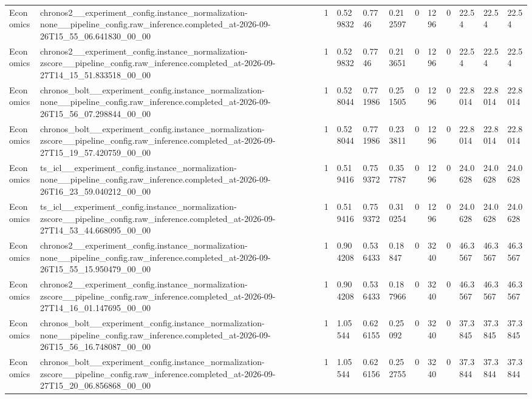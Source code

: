 \begin{tabular}{llllllllllll}
Economics & chronos2\_\_experiment\_config.instance\_normalization-none\_\_pipeline\_config.raw\_inference.completed\_at-2026-09-26T15\_55\_06.641830\_00\_00 & 1 & 0.529832 & 0.7746 & 0.212597 & 0 & 1296 & 0 & 22.54 & 22.54 & 22.54 \\
Economics & chronos2\_\_experiment\_config.instance\_normalization-zscore\_\_pipeline\_config.raw\_inference.completed\_at-2026-09-27T14\_15\_51.833518\_00\_00 & 1 & 0.529832 & 0.7746 & 0.213651 & 0 & 1296 & 0 & 22.54 & 22.54 & 22.54 \\
Economics & chronos\_bolt\_\_experiment\_config.instance\_normalization-none\_\_pipeline\_config.raw\_inference.completed\_at-2026-09-26T15\_56\_07.298844\_00\_00 & 1 & 0.528044 & 0.771986 & 0.251505 & 0 & 1296 & 0 & 22.8014 & 22.8014 & 22.8014 \\
Economics & chronos\_bolt\_\_experiment\_config.instance\_normalization-zscore\_\_pipeline\_config.raw\_inference.completed\_at-2026-09-27T15\_19\_57.420759\_00\_00 & 1 & 0.528044 & 0.771986 & 0.233811 & 0 & 1296 & 0 & 22.8014 & 22.8014 & 22.8014 \\
Economics & ts\_icl\_\_experiment\_config.instance\_normalization-none\_\_pipeline\_config.raw\_inference.completed\_at-2026-09-26T16\_23\_59.040212\_00\_00 & 1 & 0.519416 & 0.759372 & 0.357787 & 0 & 1296 & 0 & 24.0628 & 24.0628 & 24.0628 \\
Economics & ts\_icl\_\_experiment\_config.instance\_normalization-zscore\_\_pipeline\_config.raw\_inference.completed\_at-2026-09-27T14\_53\_44.668095\_00\_00 & 1 & 0.519416 & 0.759372 & 0.310254 & 0 & 1296 & 0 & 24.0628 & 24.0628 & 24.0628 \\
Economics & chronos2\_\_experiment\_config.instance\_normalization-none\_\_pipeline\_config.raw\_inference.completed\_at-2026-09-26T15\_55\_15.950479\_00\_00 & 1 & 0.904208 & 0.536433 & 0.18847 & 0 & 3240 & 0 & 46.3567 & 46.3567 & 46.3567 \\
Economics & chronos2\_\_experiment\_config.instance\_normalization-zscore\_\_pipeline\_config.raw\_inference.completed\_at-2026-09-27T14\_16\_01.147695\_00\_00 & 1 & 0.904208 & 0.536433 & 0.187966 & 0 & 3240 & 0 & 46.3567 & 46.3567 & 46.3567 \\
Economics & chronos\_bolt\_\_experiment\_config.instance\_normalization-none\_\_pipeline\_config.raw\_inference.completed\_at-2026-09-26T15\_56\_16.748087\_00\_00 & 1 & 1.05544 & 0.626155 & 0.25092 & 0 & 3240 & 0 & 37.3845 & 37.3845 & 37.3845 \\
Economics & chronos\_bolt\_\_experiment\_config.instance\_normalization-zscore\_\_pipeline\_config.raw\_inference.completed\_at-2026-09-27T15\_20\_06.856868\_00\_00 & 1 & 1.05544 & 0.626156 & 0.252755 & 0 & 3240 & 0 & 37.3844 & 37.3844 & 37.3844 \\

\end{tabular}
